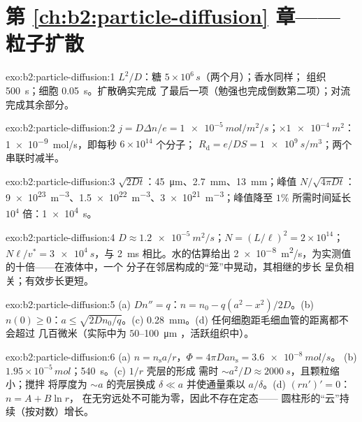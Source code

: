 \section*{第 \ref{ch:b2:particle-diffusion} 章——粒子扩散}

\begin{solution}{exo:b2:particle-diffusion:1}
$L^2/D$：糖 $5 \times 10^6\,\unit{s}$（两个月）；香水同样；
组织 \qty{500}{s}；细胞 \qty{0.05}{s}。扩散确实完成
了最后一项（勉强也完成倒数第二项）；对流完成其余部分。
\end{solution}

\begin{solution}{exo:b2:particle-diffusion:2}
$j = D\Delta n/e = \qty{1e-5}{mol/m^2/s}$；$\times \qty{1e-4}{m^2}$：
\qty{1e-9}{mol/s}，即每秒 $6 \times 10^{14}$ 个分子；
$R_{\text{d}} = e/DS = \qty{1e9}{s/m^3}$；两个串联时减半。
\end{solution}

\begin{solution}{exo:b2:particle-diffusion:3}
$\sqrt{2Dt}$：\qty{45}{\micro m}、\qty{2.7}{mm}、\qty{13}{mm}；峰值 $N/\sqrt{4\pi
Dt}$：\qty{9e23}{m^{-3}}、\qty{1.5e22}{m^{-3}}、\qty{3e21}{m^{-3}}；峰值降至 $1\%$
所需时间延长 $10^4$ 倍：\qty{1e4}{s}。
\end{solution}

\begin{solution}{exo:b2:particle-diffusion:4}
$D \approx \qty{1.2e-5}{m^2/s}$；$N = (L/\ell)^2 = 2 \times 10^{14}$；$N\ell/v^*
= \qty{3e4}{s}$，与 \qty{2}{ms} 相比。水的估算给出
\qty{2e-8}{m^2/s}，为实测值的十倍——在液体中，一个
分子在邻居构成的“笼”中晃动，其相继的步长
呈负相关；有效步长更短。
\end{solution}

\begin{solution}{exo:b2:particle-diffusion:5}
(a) $Dn'' = q$：$n = n_0 - q(a^2 - x^2)/2D$。(b) $n(0) \ge 0$：$a \le
\sqrt{2Dn_0/q}$。(c) \qty{0.28}{mm}。(d) 任何细胞距毛细血管的距离都不会超过
几百微米（实际中为 $50$--\qty{100}{\micro m}
，活跃组织中）。
\end{solution}

\begin{solution}{exo:b2:particle-diffusion:6}
(a) $n = n_{\text{s}}a/r$，$\Phi = 4\pi D a n_{\text{s}} = \qty{3.6e-8}{mol/s}$。
(b) $1.95 \times 10^{-5}\,\unit{mol}$；\qty{540}{s}。(c) $1/r$ 壳层的形成
需时 $\sim a^2/D \approx \qty{2000}{s}$，且颗粒缩小；搅拌
将厚度为 $\sim a$ 的壳层换成 $\delta \ll a$
并使通量乘以 $a/\delta$。(d) $(rn')' = 0$：$n = A + B\ln r$，
在无穷远处不可能为零，因此不存在定态——
圆柱形的“云”持续（按对数）增长。
\end{solution}

